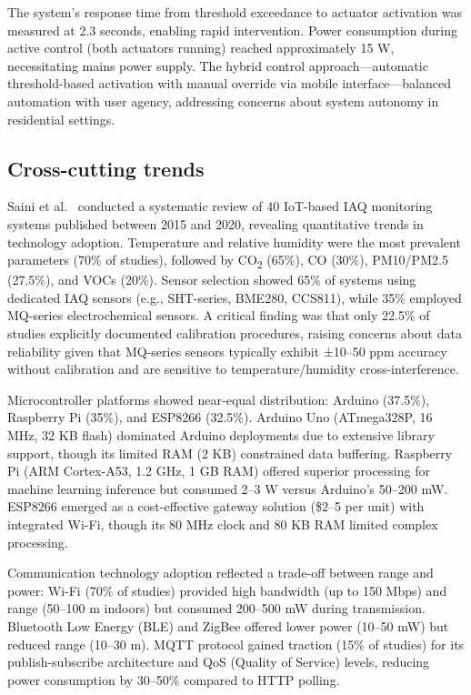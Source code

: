 \documentclass[12pt]{report}
\begin{document}
The system's response time from threshold exceedance to actuator activation was measured at 2.3 seconds, enabling rapid intervention. Power consumption during active control (both actuators running) reached approximately 15 W, necessitating mains power supply. The hybrid control approach—automatic threshold-based activation with manual override via mobile interface—balanced automation with user agency, addressing concerns about system autonomy in residential settings.

\subsection{Cross-cutting trends}
Saini et al.~\cite{saini2020} conducted a systematic review of 40 IoT-based IAQ monitoring systems published between 2015 and 2020, revealing quantitative trends in technology adoption. Temperature and relative humidity were the most prevalent parameters (70\% of studies), followed by CO\textsubscript{2} (65\%), CO (30\%), PM10/PM2.5 (27.5\%), and VOCs (20\%). Sensor selection showed 65\% of systems using dedicated IAQ sensors (e.g., SHT-series, BME280, CCS811), while 35\% employed MQ-series electrochemical sensors. A critical finding was that only 22.5\% of studies explicitly documented calibration procedures, raising concerns about data reliability given that MQ-series sensors typically exhibit ±10--50 ppm accuracy without calibration and are sensitive to temperature/humidity cross-interference.

Microcontroller platforms showed near-equal distribution: Arduino (37.5\%), Raspberry Pi (35\%), and ESP8266 (32.5\%). Arduino Uno (ATmega328P, 16 MHz, 32 KB flash) dominated Arduino deployments due to extensive library support, though its limited RAM (2 KB) constrained data buffering. Raspberry Pi (ARM Cortex-A53, 1.2 GHz, 1 GB RAM) offered superior processing for machine learning inference but consumed 2--3 W versus Arduino's 50--200 mW. ESP8266 emerged as a cost-effective gateway solution (\$2--5 per unit) with integrated Wi-Fi, though its 80 MHz clock and 80 KB RAM limited complex processing.

Communication technology adoption reflected a trade-off between range and power: Wi-Fi (70\% of studies) provided high bandwidth (up to 150 Mbps) and range (50--100 m indoors) but consumed 200--500 mW during transmission. Bluetooth Low Energy (BLE) and ZigBee offered lower power (10--50 mW) but reduced range (10--30 m). MQTT protocol gained traction (15\% of studies) for its publish-subscribe architecture and QoS (Quality of Service) levels, reducing power consumption by 30--50\% compared to HTTP polling.
\end{document}
